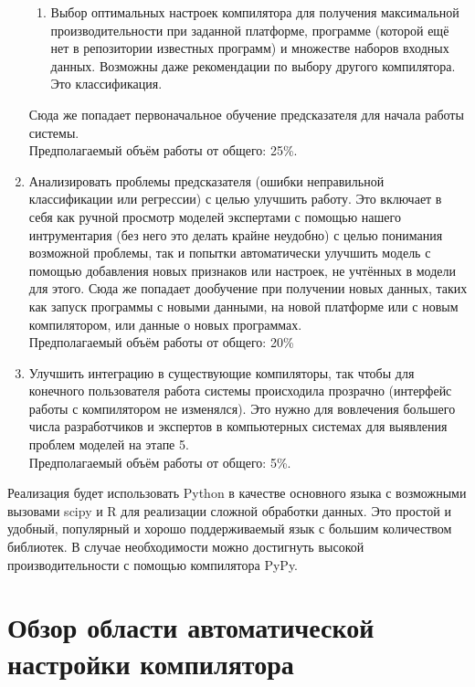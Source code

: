 \begin{enumerate}
{\begin{enumerate}
	\item Выбор оптимальных настроек компилятора для получения максимальной производительности при заданной платформе, программе (которой ещё нет в репозитории известных программ) и множестве наборов входных данных. Возможны даже рекомендации по выбору другого компилятора. Это классификация.
	\end{enumerate}
Сюда же попадает первоначальное обучение предсказателя для начала работы системы.\\
Предполагаемый объём работы от общего: 25\%.}
\item {Анализировать проблемы предсказателя (ошибки неправильной классификации или регрессии) с целью улучшить работу.
Это включает в себя как ручной просмотр моделей экспертами с помощью нашего интрументария (без него это делать крайне неудобно) с целью понимания возможной проблемы, так и попытки автоматически улучшить модель с помощью добавления новых признаков или настроек, не учтённых в модели для этого.
Сюда же попадает дообучение при получении новых данных, таких как запуск программы с новыми данными, на новой платформе или с новым компилятором, или данные о новых программах.\\
Предполагаемый объём работы от общего: 20\%}
\item {Улучшить интеграцию в существующие компиляторы, так чтобы для конечного пользователя работа системы происходила прозрачно (интерфейс работы с компилятором не изменялся). Это нужно для вовлечения большего числа разработчиков и экспертов в компьютерных системах для выявления проблем моделей на этапе 5.\\
Предполагаемый объём работы от общего: 5\%.}
\end{enumerate}

Реализация будет использовать Python в качестве основного языка с возможными вызовами scipy и R для реализации сложной обработки данных. Это простой и удобный, популярный и хорошо поддерживаемый язык с большим количеством библиотек. В случае необходимости можно достигнуть высокой производительности с помощью компилятора PyPy.

\section{Обзор области автоматической настройки компилятора}

